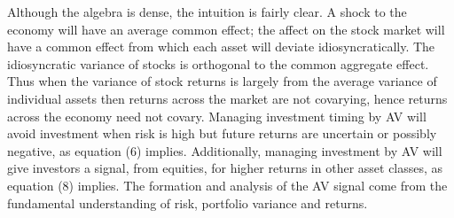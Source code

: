 Although the algebra is dense, the intuition is fairly clear. A shock to the economy will have an average common effect; the affect on the stock market will have a common effect from which each asset will deviate idiosyncratically. The idiosyncratic variance of stocks is orthogonal to the common aggregate effect. Thus when the variance of stock returns is largely from the average variance of individual assets then returns across the market are not covarying, hence returns across the economy need not covary. Managing investment timing by AV will avoid investment when risk is high but future returns are uncertain or possibly negative, as equation (6) implies. Additionally, managing investment by AV will give investors a signal, from equities, for higher returns in other asset classes, as equation (8) implies. The formation and analysis of the AV signal come from the fundamental understanding of risk, portfolio variance and returns. %

